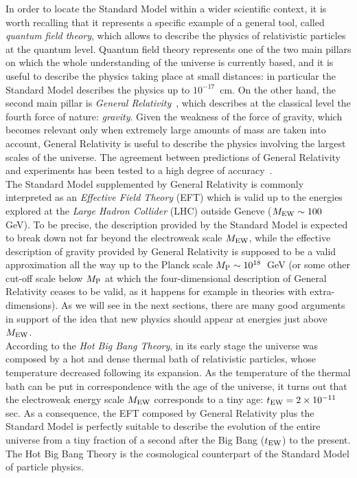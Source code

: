 \documentclass[12pt,a4paper]{book}
\begin{document}
In order to locate the Standard Model within a wider scientific context, it is worth recalling that it represents a specific example of a general tool, called \textit{quantum field theory}, which allows to describe the physics of relativistic particles at the quantum level. Quantum field theory represents one of the two main pillars on which the whole understanding of the universe is currently based, and it is useful to describe the physics taking place at small distances: in particular the Standard Model describes the physics up to $10^{-17} \,$ cm. On the other hand, the second main pillar is \textit{General Relativity}~\cite{Einstein:1915ca}, which describes at the classical level the fourth force of nature: \textit{gravity}. Given the weakness of the force of gravity, which becomes relevant only when extremely large amounts of mass are taken into account, General Relativity is useful to describe the physics involving the largest scales of the universe. The agreement between predictions of General Relativity and experiments has been tested to a high degree of accuracy~\cite{Will:2001mx}.\\

The Standard Model supplemented by General Relativity is commonly interpreted as an \textit{Effective Field Theory} (EFT) which is valid up to the energies explored at the \textit{Large Hadron Collider} (LHC) outside Geneve ($M_{\rm EW} \sim 100 \,$ GeV). To be precise, the description provided by the Standard Model is expected to break down not far beyond the electroweak scale $M_{\rm EW}$, while the effective description of gravity provided by General Relativity is supposed to be a valid approximation all the way up to the Planck scale $M_{\rm P} \sim 10^{18} \,$ GeV (or some other cut-off scale below $M_{\rm P}$ at which the four-dimensional description of General Relativity ceases to be valid, as it happens for example in theories with extra-dimensions). As we will see in the next sections, there are many good arguments in support of the idea that new physics should appear at energies just above $M_{\rm EW}$.\\

According to the \textit{Hot Big Bang Theory}, in its early stage the universe was composed by a hot and dense thermal bath of relativistic particles, whose temperature decreased following its expansion. As the temperature of the thermal bath can be put in correspondence with the age of the universe, it turns out that the electroweak energy scale $M_{\rm EW}$ corresponds to a tiny age: $t_{\rm EW} = 2 \times 10^{-11} \,$ sec. As a consequence, the EFT composed by General Relativity plus the Standard Model is perfectly suitable to describe the evolution of the entire universe from a tiny fraction of a second after the Big Bang ($t_{\rm EW}$) to the present. The Hot Big Bang Theory is the cosmological counterpart of the Standard Model of particle physics.\\
\end{document}
